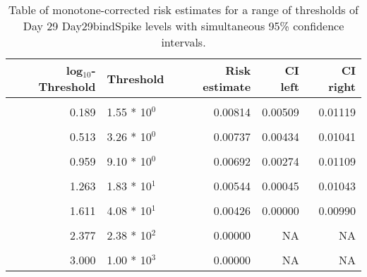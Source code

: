 \documentclass[]{article}
\begin{document}
\begin{table}[!h]

\caption{\label{tab:unnamed-chunk-62}Table of monotone-corrected risk estimates for a range of thresholds of Day 29 Day29bindSpike levels with simultaneous 95\% confidence intervals.}
\centering
\begin{tabular}[t]{rlrrr}
\toprule
log$_{10}$-Threshold & Threshold & Risk estimate & CI left & CI right\\
\midrule
\cellcolor{gray!6}{-0.813} & \cellcolor{gray!6}{1.54 * 10$^{1}$} & \cellcolor{gray!6}{0.00857} & \cellcolor{gray!6}{0.00570} & \cellcolor{gray!6}{0.01144}\\
0.189 & 1.55 * 10$^{0}$ & 0.00814 & 0.00509 & 0.01119\\
\cellcolor{gray!6}{0.341} & \cellcolor{gray!6}{2.19 * 10$^{0}$} & \cellcolor{gray!6}{0.00797} & \cellcolor{gray!6}{0.00493} & \cellcolor{gray!6}{0.01100}\\
0.513 & 3.26 * 10$^{0}$ & 0.00737 & 0.00434 & 0.01041\\
\cellcolor{gray!6}{0.792} & \cellcolor{gray!6}{6.19 * 10$^{0}$} & \cellcolor{gray!6}{0.00723} & \cellcolor{gray!6}{0.00380} & \cellcolor{gray!6}{0.01066}\\
0.959 & 9.10 * 10$^{0}$ & 0.00692 & 0.00274 & 0.01109\\
\cellcolor{gray!6}{1.113} & \cellcolor{gray!6}{1.30 * 10$^{1}$} & \cellcolor{gray!6}{0.00613} & \cellcolor{gray!6}{0.00133} & \cellcolor{gray!6}{0.01092}\\
1.263 & 1.83 * 10$^{1}$ & 0.00544 & 0.00045 & 0.01043\\
\cellcolor{gray!6}{1.491} & \cellcolor{gray!6}{3.10 * 10$^{1}$} & \cellcolor{gray!6}{0.00426} & \cellcolor{gray!6}{0.00000} & \cellcolor{gray!6}{0.00922}\\
1.611 & 4.08 * 10$^{1}$ & 0.00426 & 0.00000 & 0.00990\\
\cellcolor{gray!6}{1.729} & \cellcolor{gray!6}{5.36 * 10$^{1}$} & \cellcolor{gray!6}{0.00348} & \cellcolor{gray!6}{0.00000} & \cellcolor{gray!6}{0.00790}\\
2.377 & 2.38 * 10$^{2}$ & 0.00000 & NA & NA\\
\cellcolor{gray!6}{2.699} & \cellcolor{gray!6}{5.00 * 10$^{2}$} & \cellcolor{gray!6}{0.00000} & \cellcolor{gray!6}{NA} & \cellcolor{gray!6}{NA}\\
3.000 & 1.00 * 10$^{3}$ & 0.00000 & NA & NA\\
\bottomrule
\end{tabular}
\end{table}
\end{document}
